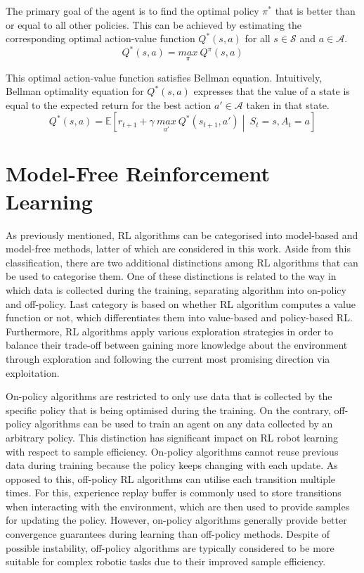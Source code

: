 The primary goal of the agent is to find the optimal policy \(\pi^{*}\) that is better than or equal to all other policies. This can be achieved by estimating the corresponding optimal action-value function \(Q^{*}(s, a)\) for all \(s \in \mathcal{S}\) and \(a \in \mathcal{A}\).
\begin{equation}
    Q^{*}(s, a) = \underset{\pi}{max}\ Q^{\pi}(s, a)
    \label{eq:optimal_action_value_function}
\end{equation}

This optimal action-value function satisfies Bellman equation. Intuitively, Bellman optimality equation for \(Q^{*}(s, a)\) expresses that the value of a state is equal to the expected return for the best action \(a' \in \mathcal{A}\) taken in that state.
\begin{equation}
    Q^{*}(s, a) = \mathbb{E} \left[ r_{t+1} + \gamma\ \underset{a'}{max}\ Q^{*}(s_{t+1}, a') \middle\vert\ S_{t}{=}s, A_{t}{=}a \right]
\end{equation}


\section{Model-Free Reinforcement Learning}

As previously mentioned, RL algorithms can be categorised into model-based and model-free methods, latter of which are considered in this work. Aside from this classification, there are two additional distinctions among RL algorithms that can be used to categorise them. One of these distinctions is related to the way in which data is collected during the training, separating algorithm into on-policy and off-policy. Last category is based on whether RL algorithm computes a value function or not, which differentiates them into value-based and policy-based RL. Furthermore, RL algorithms apply various exploration strategies in order to balance their trade-off between gaining more knowledge about the environment through exploration and following the current most promising direction via exploitation.

On-policy algorithms are restricted to only use data that is collected by the specific policy that is being optimised during the training. On the contrary, off-policy algorithms can be used to train an agent on any data collected by an arbitrary policy. This distinction has significant impact on RL robot learning with respect to sample efficiency. On-policy algorithms cannot reuse previous data during training because the policy keeps changing with each update. As opposed to this, off-policy RL algorithms can utilise each transition multiple times. For this, experience replay buffer \cite{mnih_human-level_2015} is commonly used to store transitions when interacting with the environment, which are then used to provide samples for updating the policy. However, on-policy algorithms generally provide better convergence guarantees during learning than off-policy methods. Despite of possible instability, off-policy algorithms are typically considered to be more suitable for complex robotic tasks due to their improved sample efficiency.


